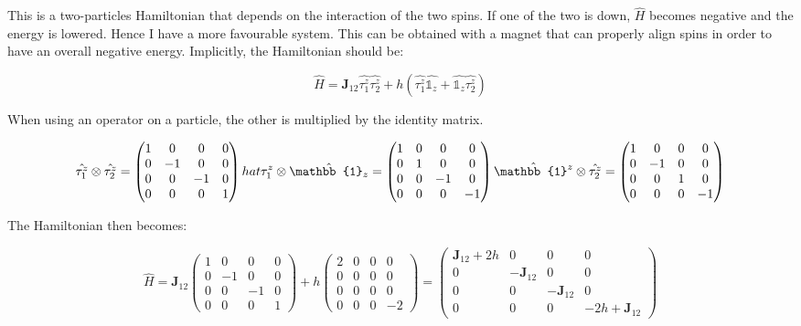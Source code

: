 	This is a two-particles Hamiltonian that depends on the interaction of the two spins.
	If one of the two is down, $\hat{H}$ becomes negative and the energy is lowered.
	Hence I have a more favourable system.
	This can be obtained with a magnet that can properly align spins in order to have an overall negative energy.
	Implicitly, the Hamiltonian should be:

	$$\hat{H}=\mathbf{J}_{12}\hat{\tau_1^z}\hat{\tau_2^z}+h(\hat{\tau_1^z}\hat{\mathbb{1}_z}+\hat{\mathbb{1}_z}\hat{\tau_2^z})$$

	When using an operator on a particle, the other is multiplied by the identity matrix.

	$$\hat{\tau_1^z}\otimes\hat{\tau_2^z}=\begin{pmatrix}1&0&0&0\\0&-1&0&0\\0&0&-1&0\\0&0&0&1\end{pmatrix}\\hat{\tau_1^z}\otimes\hat{\mathbb{1}_z}=\begin{pmatrix}1&0&0&0\\0&1&0&0\\0&0&-1&0\\0&0&0&-1\end{pmatrix}\hat{\mathbb{1}^z}\otimes\hat{\tau_2^z}=\begin{pmatrix}1&0&0&0\\0&-1&0&0\\0&0&1&0\\0&0&0&-1\end{pmatrix}$$

	The Hamiltonian then becomes:

	$$\hat{H}=\mathbf{J}_{12}\begin{pmatrix}1&0&0&0\\0&-1&0&0\\0&0&-1&0\\0&0&0&1\end{pmatrix}+h\begin{pmatrix}2&0&0&0\\0&0&0&0\\0&0&0&0\\0&0&0&-2\end{pmatrix}=\begin{pmatrix}\mathbf{J}_{12}+2h&0&0&0\\0&-\mathbf{J}_{12}&0&0\\0&0&-\mathbf{J}_{12}&0\\0&0&0&-2h+\mathbf{J}_{12}\end{pmatrix}$$

